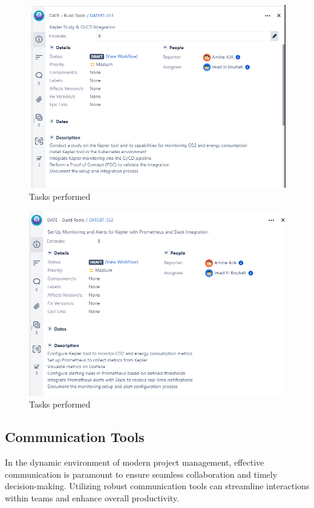\begin{figure}[H]
    \centering
    \includegraphics[width=16cm]{Figures/us-1.png}
    \caption{Tasks performed}
\end{figure}

\begin{figure}[H]
  \centering
  \includegraphics[width=16cm]{Figures/us-2.png}
  \caption{Tasks performed}
\end{figure}

\subsection{Communication Tools}

In the dynamic environment of modern project management, effective communication is paramount to ensure seamless collaboration and timely decision-making. Utilizing robust communication tools can streamline interactions within teams and enhance overall productivity.


